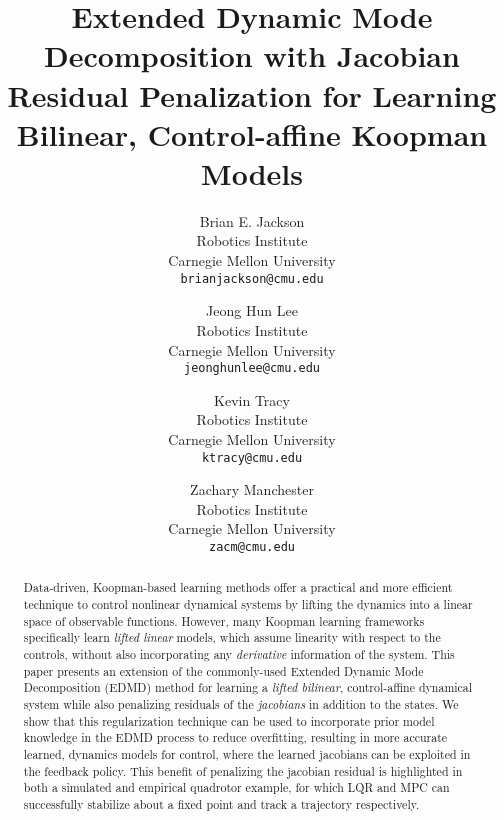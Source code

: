 \documentclass{article}
\title{Extended Dynamic Mode Decomposition with Jacobian Residual Penalization for Learning Bilinear, Control-affine Koopman Models}
\author{
  Brian E. Jackson \\
  Robotics Institute \\
  Carnegie Mellon University\\
  \texttt{brianjackson@cmu.edu} \\
  \and
  Jeong Hun Lee \\
  Robotics Institute\\
  Carnegie Mellon University\\
  \texttt{jeonghunlee@cmu.edu} \\
  \and
  Kevin Tracy \\
  Robotics Institute\\
  Carnegie Mellon University\\
  \texttt{ktracy@cmu.edu} \\
  \and
  Zachary Manchester \\
  Robotics Institute\\
  Carnegie Mellon University\\
  \texttt{zacm@cmu.edu} \\
}
\begin{document}
\maketitle


\begin{abstract}
    Data-driven, Koopman-based learning methods offer a practical and more efficient technique to control nonlinear dynamical systems by lifting the dynamics into a linear space of observable functions. However, many Koopman learning frameworks specifically learn \emph{lifted linear} models, which assume linearity with respect to the controls, without also incorporating any \emph{derivative} information of the system. This paper presents an extension of the commonly-used Extended Dynamic Mode Decomposition (EDMD) method for learning a \emph{lifted bilinear}, control-affine dynamical system while also penalizing residuals of the \emph{jacobians} in addition to the states. We show that this regularization technique can be used to incorporate prior model knowledge in the EDMD process to reduce overfitting, resulting in more accurate learned, dynamics models for control, where the learned jacobians can be exploited in the feedback policy. This benefit of penalizing the jacobian residual is highlighted in both a simulated and empirical quadrotor example, for which LQR and MPC can successfully stabilize about a fixed point and track a trajectory respectively.
\end{abstract}


\end{document}
